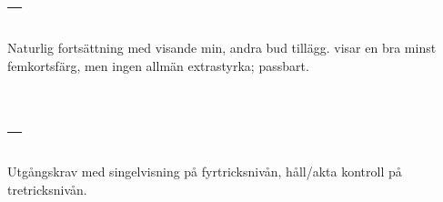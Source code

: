 \ebe

\section{ -- }

Naturlig forts\"attning med  visande min, andra bud till\"agg. 
visar en bra minst fem\-korts\-f\"arg, men ingen
allm\"an extrastyrka; passbart.

\section{ -- }

Utgångskrav med singelvisning på fyrtricksnivån, håll/akta kontroll på
tretricksnivån.

